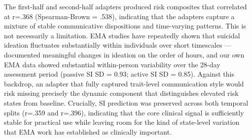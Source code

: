\documentclass[review,12pt,authoryear]{elsarticle}
\begin{document}
The first-half and second-half adapters produced risk composites that correlated at
r=.368 (Spearman-Brown = .538), indicating that the adapters capture a mixture of stable communicative dispositions and time-varying patterns. This is not necessarily a limitation. EMA studies have repeatedly shown that suicidal ideation fluctuates substantially within individuals over short timescales — \citet{kleiman2017examination} documented meaningful changes in ideation on the order of hours, and our own EMA data showed substantial within-person variability over the 28-day assessment period (passive SI SD = 0.93; active SI SD = 0.85). Against this backdrop, an adapter that fully captured trait-level communication style would risk missing precisely the dynamic component that distinguishes elevated risk states from baseline. Crucially, SI prediction was preserved across both temporal splits (r=.359 and r=.396), indicating that the core clinical signal is sufficiently stable for practical use while leaving room for the kind of state-level variation that EMA work has established as clinically important.



\end{document}
